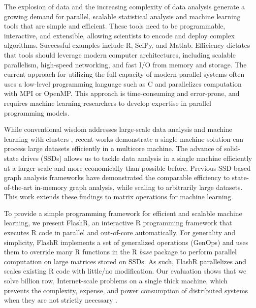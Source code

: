 
The explosion of data and the increasing complexity of data analysis
generate a growing demand for parallel, scalable statistical analysis
and machine learning tools that are simple and efficient.
These tools need to be programmable, interactive, and extensible,
allowing scientists to encode and deploy complex algorithms.
Successful examples include R, SciPy, and Matlab.  Efficiency dictates that
tools should leverage modern computer architectures, including scalable
parallelism, high-speed networking, and fast I/O from memory and storage.
The current approach for utilizing the full
capacity of modern parallel systems often uses a low-level programming
language such as C and parallelizes computation with MPI or OpenMP.
This approach is time-consuming and error-prone, and requires machine learning
researchers to develop expertise in parallel programming models.


While conventional wisdom addresses large-scale data analysis and machine
learning with clusters
\cite{mapreduce,spark,systemml,tensorflow,petuum,graphlab}, recent works
\cite{flashgraph,gridgraph,Matveev17,hotos} demonstrate a single-machine
solution can process large datasets efficiently in a multicore
machine. The advance of solid-state drives (SSDs) allows us to tackle data
analysis in a single machine efficiently at a larger scale and more economically
than possible before. Previous SSD-based graph analysis frameworks
\cite{flashgraph, gridgraph, graphene}
have demonstrated the comparable efficiency to state-of-the-art in-memory graph
analysis, while scaling to arbitrarily large datasets. This work extends
these findings to matrix operations for machine learning.


To provide a simple programming framework for efficient and scalable machine
learning, we present FlashR, an interactive R programming framework that
executes R code in parallel and out-of-core automatically. For
generality and simplicity, FlashR implements
a set of generalized operations (GenOps) and uses them to override many
R functions in the R \textit{base} package to perform parallel computation on
large matrices stored on SSDs. As such, FlashR parallelizes and scales
existing R code with little/no modification.
Our evaluation shows that we solve billion row, Internet-scale
problems on a single thick machine, which prevents the complexity,
expense, and power consumption of distributed systems when they are
not strictly necessary \cite{hotos}.

